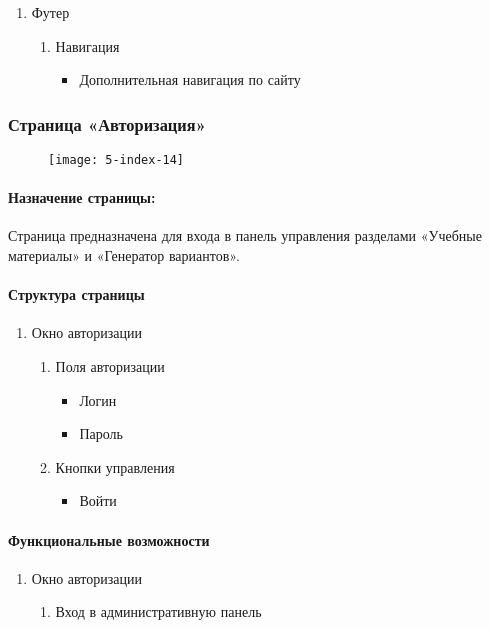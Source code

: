 \begin{enumerate}
	\item Футер
	\begin{enumerate}
		\item Навигация
		\begin{itemize}
			\item Дополнительная навигация по сайту
		\end{itemize}
	\end{enumerate}
\end{enumerate}


\subsubsection{Страница «Авторизация»}
\begin{figure}[H]
\texttt{[image: 5-index-14]}
\end{figure}
\paragraph{Назначение страницы:} Страница предназначена для входа в панель управления разделами «Учебные материалы» и «Генератор вариантов».

\paragraph{Структура страницы}
\begin{enumerate}
	\item Окно авторизации
	\begin{enumerate}
		\item Поля авторизации
		\begin{itemize}
			\item Логин
			\item Пароль
		\end{itemize}
		\item Кнопки управления
		\begin{itemize}
			\item Войти
		\end{itemize}
	\end{enumerate}
\end{enumerate}

\paragraph{Функциональные возможности}
\begin{enumerate}
	\item Окно авторизации
	\begin{enumerate}
		\item Вход в административную панель
	\end{enumerate}
\end{enumerate}


